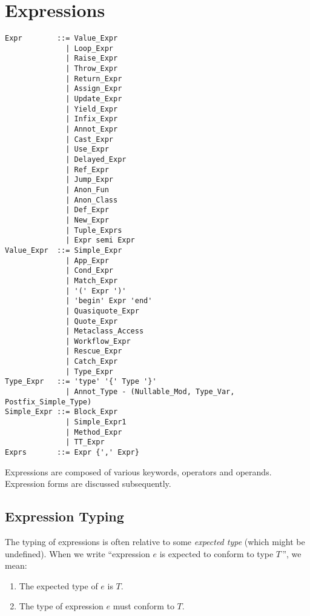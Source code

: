 
\chapter{Expressions}

\minitoc

\newpage

\syntax\begin{lstlisting}
Expr        ::= Value_Expr
              | Loop_Expr
              | Raise_Expr 
              | Throw_Expr
              | Return_Expr
              | Assign_Expr
              | Update_Expr
              | Yield_Expr
              | Infix_Expr
              | Annot_Expr
              | Cast_Expr
              | Use_Expr
              | Delayed_Expr
              | Ref_Expr
              | Jump_Expr
              | Anon_Fun
              | Anon_Class
              | Def_Expr
              | New_Expr
              | Tuple_Exprs
              | Expr semi Expr
Value_Expr  ::= Simple_Expr
              | App_Expr
              | Cond_Expr
              | Match_Expr
              | '(' Expr ')'
              | 'begin' Expr 'end'
              | Quasiquote_Expr
              | Quote_Expr
              | Metaclass_Access
              | Workflow_Expr
              | Rescue_Expr
              | Catch_Expr
              | Type_Expr
Type_Expr   ::= 'type' '{' Type '}'
              | Annot_Type - (Nullable_Mod, Type_Var, Postfix_Simple_Type)
Simple_Expr ::= Block_Expr
              | Simple_Expr1
              | Method_Expr
              | TT_Expr
Exprs       ::= Expr {',' Expr}
\end{lstlisting}

Expressions are composed of various keywords, operators and operands. Expression forms are discussed subsequently. 







\section{Expression Typing}
\label{sec:expression-typing}

The typing of expressions is often relative to some {\em expected type} (which might be undefined). When we write ``expression $e$ is expected to conform to type $T$\,'', we mean:
\begin{enumerate}
\item The expected type of $e$ is $T$.
\item The type of expression $e$ must conform to $T$. 
\end{enumerate}

